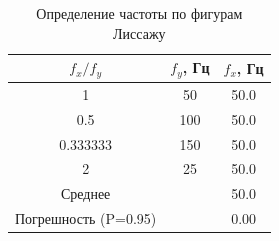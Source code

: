 \begin{table}[h]
\centering
\caption{Определение частоты по фигурам Лиссажу}
\label{tab:lissajous}
\begin{tabular}{|c|c|c|}
\hline
$f_x/f_y$ & $f_y$, Гц & $f_x$, Гц \\
\hline
1 & 50 & 50.0 \\
0.5 & 100 & 50.0 \\
0.333333 & 150 & 50.0 \\
2 & 25 & 50.0 \\
\hline
Среднее &  & 50.0 \\
Погрешность (P=0.95) &  & 0.00 \\
\hline
\end{tabular}
\end{table}
